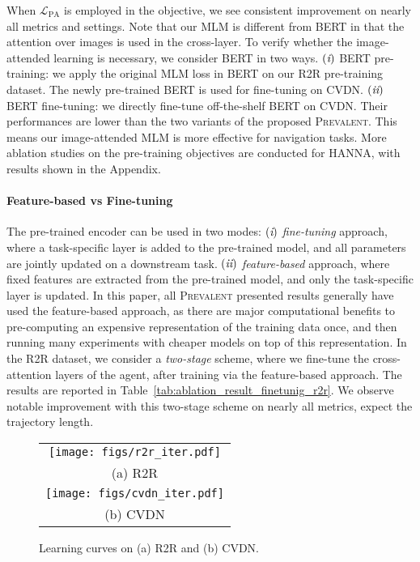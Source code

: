 \documentclass[10pt,twocolumn,letterpaper]{article}
\newcommand{\short}{\textsc{Prevalent}}
\newcommand{\RN}[1]{\textup{\lowercase\expandafter{\it \romannumeral#1}}}
\newcommand{\Lcal}{\mathcal{L}}
\begin{document}
When $\Lcal_{\text{PA}}$ is employed in the objective, we see consistent improvement on nearly all metrics and settings. 
Note that our MLM is different from BERT in that the attention over images is used in the cross-layer. To verify whether the image-attended learning is necessary, we consider BERT in two ways. 
$(\RN{1})$ BERT pre-training: we apply the original MLM loss in BERT on our R2R pre-training dataset. The newly pre-trained BERT is used for fine-tuning on CVDN. 
$(\RN{2})$ BERT fine-tuning: we directly fine-tune off-the-shelf BERT on CVDN.  
Their performances are lower than the two variants of the proposed \short{}. This means our image-attended MLM is more effective for navigation tasks. More ablation studies on the pre-training objectives are conducted for HANNA, with results shown in the Appendix.

\paragraph{Feature-based vs Fine-tuning}

The pre-trained encoder can be used in two modes: 
$(\RN{1})$ {\em fine-tuning} approach, where a task-specific layer is added to the pre-trained model, and all parameters are jointly updated on a downstream task. 
$(\RN{2})$ {\em feature-based} approach, where fixed features are extracted from the pre-trained model, and only the task-specific layer is updated.
In this paper, all \short{} presented results generally have used the feature-based approach, as there are major computational benefits to pre-computing an expensive representation of the training data once, and then running many experiments with cheaper models on top of this representation. In the R2R dataset, we consider a {\em two-stage} scheme, where we fine-tune the cross-attention layers of the agent, after training via the feature-based approach. The results are reported in Table~\ref{tab:ablation_result_finetunig_r2r}. We observe notable improvement with this two-stage scheme on nearly all metrics, expect the trajectory length. 


\begin{figure}[t!]\vspace{-0mm}\centering
	\begin{tabular}{c}
		\hspace{-4mm}
		\texttt{[image: figs/r2r\_iter.pdf]} 
		\vspace{-2mm}\\
		(a) R2R  \\
		\hspace{-2mm}
		\texttt{[image: figs/cvdn\_iter.pdf]} 
		\vspace{-2mm} \\
		(b) CVDN 
		 \vspace{-2mm}
	\end{tabular}
\caption{Learning curves on (a) R2R and (b) CVDN.}
	\vspace{-0mm}
	\label{fig:lc_comparison}
\end{figure}
\end{document}
